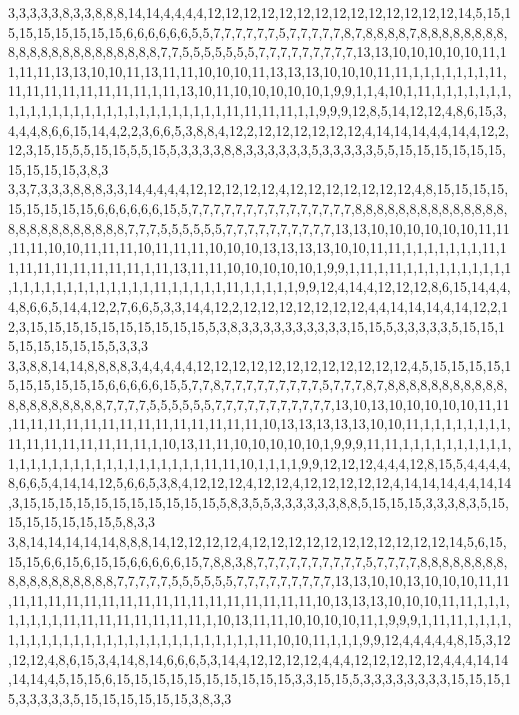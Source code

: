 3,3,3,3,3,8,3,3,8,8,8,14,14,4,4,4,4,12,12,12,12,12,12,12,12,12,12,12,12,12,12,14,5,15,15,15,15,15,15,15,15,6,6,6,6,6,6,5,5,7,7,7,7,7,7,5,7,7,7,7,7,8,7,8,8,8,8,7,8,8,8,8,8,8,8,8,8,8,8,8,8,8,8,8,8,8,8,8,8,8,7,7,5,5,5,5,5,5,5,7,7,7,7,7,7,7,7,7,13,13,10,10,10,10,10,11,11,11,11,13,13,10,10,11,13,11,11,10,10,10,11,13,13,13,10,10,10,11,11,1,1,1,1,1,1,1,11,11,11,11,11,11,11,11,11,1,11,13,10,11,10,10,10,10,10,1,9,9,1,1,4,10,1,11,1,1,1,1,1,1,1,1,1,1,1,1,1,1,1,1,1,1,1,1,1,1,1,1,1,1,1,11,11,11,11,1,1,9,9,9,12,8,5,14,12,12,4,8,6,15,3,4,4,4,8,6,6,15,14,4,2,2,3,6,6,5,3,8,8,4,12,2,12,12,12,12,12,12,4,14,14,14,4,4,14,4,12,2,12,3,15,15,5,5,15,15,5,5,15,5,3,3,3,3,8,8,3,3,3,3,3,3,5,3,3,3,3,3,5,5,15,15,15,15,15,15,15,15,15,15,3,8,3
3,3,7,3,3,3,8,8,8,3,3,14,4,4,4,4,12,12,12,12,12,4,12,12,12,12,12,12,12,4,8,15,15,15,15,15,15,15,15,15,6,6,6,6,6,6,15,5,7,7,7,7,7,7,7,7,7,7,7,7,7,7,7,8,8,8,8,8,8,8,8,8,8,8,8,8,8,8,8,8,8,8,8,8,8,8,8,8,7,7,7,5,5,5,5,5,5,7,7,7,7,7,7,7,7,7,7,13,13,10,10,10,10,10,10,11,11,11,11,10,10,11,11,11,10,11,11,11,10,10,10,13,13,13,13,10,10,11,11,1,1,1,1,1,1,1,11,11,11,11,11,11,11,11,11,1,11,13,11,11,10,10,10,10,10,1,9,9,1,11,1,11,1,1,1,1,1,1,1,1,1,1,1,1,1,1,1,1,1,1,1,1,1,1,1,11,1,1,1,1,1,11,1,1,1,1,1,9,9,12,4,14,4,12,12,12,8,6,15,14,4,4,4,8,6,6,5,14,4,12,2,7,6,6,5,3,3,14,4,12,2,12,12,12,12,12,12,12,4,4,14,14,14,4,14,12,2,12,3,15,15,15,15,15,15,15,15,15,15,5,3,8,3,3,3,3,3,3,3,3,3,3,15,15,5,3,3,3,3,3,5,15,15,15,15,15,15,15,15,5,3,3,3
3,3,8,8,14,14,8,8,8,8,3,4,4,4,4,4,12,12,12,12,12,12,12,12,12,12,12,12,4,5,15,15,15,15,15,15,15,15,15,15,6,6,6,6,6,15,5,7,7,8,7,7,7,7,7,7,7,7,7,5,7,7,7,8,7,8,8,8,8,8,8,8,8,8,8,8,8,8,8,8,8,8,8,8,8,7,7,7,7,5,5,5,5,5,5,7,7,7,7,7,7,7,7,7,7,7,13,10,13,10,10,10,10,10,11,11,11,11,11,11,11,11,11,11,11,11,11,11,11,11,10,13,13,13,13,13,10,10,11,1,1,1,1,1,1,1,1,11,11,11,11,11,11,11,11,1,10,13,11,11,10,10,10,10,10,1,9,9,9,11,11,1,1,1,1,1,1,1,1,1,1,1,1,1,1,1,1,1,1,1,1,1,1,1,1,1,1,1,1,11,11,10,1,1,1,1,9,9,12,12,12,4,4,4,12,8,15,5,4,4,4,4,8,6,6,5,4,14,14,12,5,6,6,5,3,8,4,12,12,12,4,12,12,4,12,12,12,12,12,4,14,14,14,4,4,14,14,3,15,15,15,15,15,15,15,15,15,15,15,5,8,3,5,5,3,3,3,3,3,3,8,8,5,15,15,15,3,3,3,8,3,5,15,15,15,15,15,15,15,5,8,3,3
3,8,14,14,14,14,14,8,8,8,14,12,12,12,12,4,12,12,12,12,12,12,12,12,12,12,12,14,5,6,15,15,15,6,6,15,6,15,15,6,6,6,6,6,15,7,8,8,3,8,7,7,7,7,7,7,7,7,7,7,5,7,7,7,7,8,8,8,8,8,8,8,8,8,8,8,8,8,8,8,8,8,8,7,7,7,7,7,5,5,5,5,5,5,7,7,7,7,7,7,7,7,7,13,13,10,10,13,10,10,10,11,11,11,11,11,11,11,11,11,11,11,11,11,11,11,11,11,11,11,10,13,13,13,10,10,10,11,11,1,1,1,1,1,1,1,1,11,11,11,11,11,11,11,11,1,10,13,11,11,10,10,10,10,11,1,9,9,9,1,11,11,1,1,1,1,1,1,1,1,1,1,1,1,1,1,1,1,1,1,1,1,1,1,1,1,1,1,1,11,10,10,11,1,1,1,9,9,12,4,4,4,4,4,8,15,3,12,12,12,4,8,6,15,3,4,14,8,14,6,6,6,5,3,14,4,12,12,12,12,4,4,4,12,12,12,12,12,4,4,4,14,14,14,14,4,5,15,15,6,15,15,15,15,15,15,15,15,15,15,3,3,15,15,5,3,3,3,3,3,3,3,3,15,15,15,15,3,3,3,3,3,5,15,15,15,15,15,15,3,8,3,3
